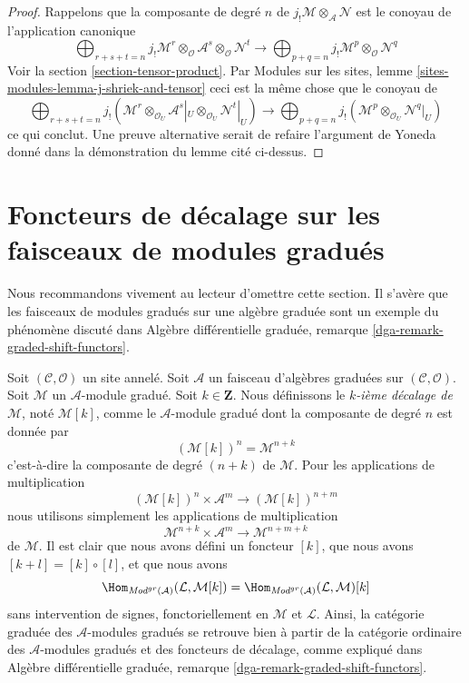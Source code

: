 \begin{proof}
Rappelons que la composante de degré $n$ de
$j_!\mathcal{M} \otimes_\mathcal{A} \mathcal{N}$ est le conoyau de
l'application canonique
$$
\bigoplus\nolimits_{r + s + t = n}
j_!\mathcal{M}^r \otimes_\mathcal{O}
\mathcal{A}^s \otimes_\mathcal{O}
\mathcal{N}^t
\longrightarrow
\bigoplus\nolimits_{p + q = n}
j_!\mathcal{M}^p \otimes_\mathcal{O} \mathcal{N}^q
$$ Voir
la section \ref{section-tensor-product}.
Par Modules sur les sites, lemme \ref{sites-modules-lemma-j-shriek-and-tensor}
ceci est la même chose que le conoyau de
$$
\bigoplus\nolimits_{r + s + t = n}
j_!(\mathcal{M}^r \otimes_{\mathcal{O}_U}
\mathcal{A}^s|_U \otimes_{\mathcal{O}_U}
\mathcal{N}^t|_U)
\longrightarrow
\bigoplus\nolimits_{p + q = n}
j_!(\mathcal{M}^p \otimes_{\mathcal{O}_U} \mathcal{N}^q|_U)
$$ ce qui
conclut. Une preuve alternative serait de refaire l'argument de Yoneda
donné dans la démonstration du lemme cité ci-dessus.
\end{proof}








\section{Foncteurs de décalage sur les faisceaux de modules gradués}
\label{section-shift}

\noindent
Nous recommandons vivement au lecteur d'omettre cette section. Il s'avère que les
faisceaux de modules gradués sur une algèbre graduée sont un exemple du phénomène
discuté dans
Algèbre différentielle graduée, remarque \ref{dga-remark-graded-shift-functors}.

\medskip\noindent
Soit $(\mathcal{C}, \mathcal{O})$ un site annelé. Soit
$\mathcal{A}$ un faisceau d'algèbres graduées sur
$(\mathcal{C}, \mathcal{O})$. Soit
$\mathcal{M}$ un $\mathcal{A}$-module gradué. Soit $k \in \mathbf{Z}$. Nous définissons
le {\it $k$-ième décalage de} $\mathcal{M}$, noté $\mathcal{M}[k]$, comme le
$\mathcal{A}$-module gradué dont la composante de degré $n$ est donnée par
$$
(\mathcal{M}[k])^n = \mathcal{M}^{n + k}
$$
c'est-à-dire la composante de degré $(n + k)$ de $\mathcal{M}$. Pour les
applications de multiplication $$
(\mathcal{M}[k])^n \times \mathcal{A}^m
\longrightarrow
(\mathcal{M}[k])^{n + m}
$$
nous utilisons
simplement les applications de multiplication $$
\mathcal{M}^{n + k} \times \mathcal{A}^m
\longrightarrow
\mathcal{M}^{n + m + k}
$$
de $\mathcal{M}$. Il est clair que nous avons défini un foncteur $[k]$,
que nous avons $[k + l] = [k] \circ [l]$,
et que nous avons $$
\Hom_{\textit{Mod}^{gr}(\mathcal{A})}(\mathcal{L}, \mathcal{M}[k])
= \Hom_{\textit{Mod}^{gr}(\mathcal{A})}(\mathcal{L}, \mathcal{M})[k]
$$
sans intervention
de signes, fonctoriellement en $\mathcal{M}$ et $\mathcal{L}$.
Ainsi, la catégorie graduée des $\mathcal{A}$-modules gradués se retrouve
bien à partir de la catégorie ordinaire des $\mathcal{A}$-modules gradués et
des foncteurs de décalage, comme expliqué dans
Algèbre différentielle graduée, remarque \ref{dga-remark-graded-shift-functors}.

